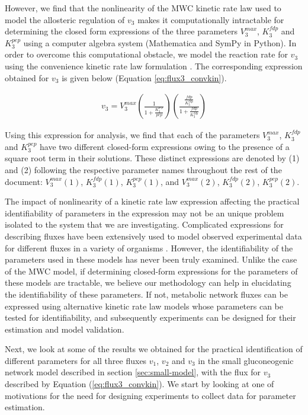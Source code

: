 \documentclass[10pt]{article}
\begin{document}
However, we find that the nonlinearity of the MWC kinetic rate law used to model the allosteric regulation of $v_3$ makes it computationally intractable for determining the closed form expressions of the three parameters $V_3^{max}$, $K_3^{fdp}$ and $K_3^{pep}$ using a computer algebra system (Mathematica and SymPy in Python). In order to overcome this computational obstacle, we model the reaction rate for $v_3$ using the convenience kinetic rate law formulation \parencite{Liebermeister2006}. The corresponding expression obtained for $v_3$ is given below (Equation \ref{eq:flux3_convkin}). 

\begin{align}\label{eq:flux3_convkin}
v_3 = V_3^{max}\left(\frac{1}{1 + \frac{K_3^{pep}}{pep}}\right)\left(\frac{\frac{fdp}{K_3^{fdp}}}{1 + \frac{fdp}{K_3^{fdp}}}\right)
\end{align}

Using this expression for analysis, we find that each of the parameters $V_3^{max}$, $K_3^{fdp}$ and $K_3^{pep}$ have two different closed-form expressions owing to the presence of a square root term in their solutions. These distinct expressions are denoted by (1) and (2) following the respective parameter names throughout the rest of the document: $V_3^{max}(1)$, $K_3^{fdp}(1)$, $K_3^{pep}(1)$, and $V_3^{max}(2)$, $K_3^{fdp}(2)$, $K_3^{pep}(2)$. 

The impact of nonlinearity of a kinetic rate law expression affecting the practical identifiability of parameters in the expression may not be an unique problem isolated to the system that we are investigating. Complicated expressions for describing fluxes have been extensively used to model observed experimental data for different fluxes in a variety of organisms \parencite{Chassagnole2002a, Peskov2012, VanHeerden2014}. However, the identifiability of the parameters used in these models has never been truly examined. Unlike the case of the MWC model, if determining closed-form expressions for the parameters of these models are tractable, we believe our methodology can help in elucidating the identifiability of these parameters. If not, metabolic network fluxes can be expressed using alternative kinetic rate law models whose parameters can be tested for identifiability, and subsequently experiments can be designed for their estimation and model validation.

Next, we look at some of the results we obtained for the practical identification of different parameters for all three fluxes $v_1$, $v_2$ and $v_3$ in the small gluconeogenic network model described in section \ref{sec:small-model}, with the flux for $v_3$ described by Equation (\ref{eq:flux3_convkin}). We start by looking at one of motivations for the need for designing experiments to collect data for parameter estimation.
\end{document}
